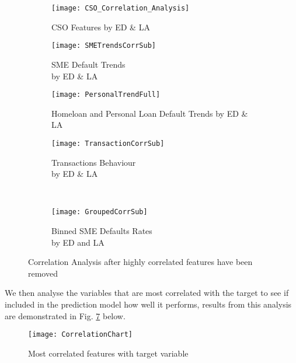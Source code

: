 \begin{figure}[H]
	\centering
	\begin{subfigure}[b]{0.32\textwidth}
		\captionsetup{font=scriptsize}
		\texttt{[image: CSO\_Correlation\_Analysis]}
		\caption{CSO Features by ED \& LA\\}
		\label{fig:CSOCorrelation}
	\end{subfigure}
	\begin{subfigure}[b]{0.32\textwidth}
		\captionsetup{font=scriptsize}
		\texttt{[image: SMETrendsCorrSub]}
		\caption{SME Default Trends \\by ED \& LA}\label{fig:SMETrendsCorrSub}
	\end{subfigure} 
	\begin{subfigure}[b]{0.32\textwidth}
		\captionsetup{font=scriptsize}
		\texttt{[image: PersonalTrendFull]}
		\caption{Homeloan and Personal Loan Default Trends by ED \& LA}
		\label{fig:PersonalTrendFull}
	\end{subfigure} 
	\medskip
	\begin{subfigure}[b]{0.32\textwidth}
		\captionsetup{font=scriptsize}
		\texttt{[image: TransactionCorrSub]}
		\caption{Transactions Behaviour \\by ED \& LA }\label{fig:TransactionCorrSub}
	\end{subfigure} ~\quad
	\begin{subfigure}[b]{0.32\textwidth}
		\captionsetup{font=scriptsize}
		\texttt{[image: GroupedCorrSub]}
		\caption{Binned SME Defaults Rates \\by ED and LA\\}
		\label{fig:GroupedCorrSub}
	\end{subfigure}
	\caption{Correlation Analysis after highly correlated features have been removed}
	\label{fig:unbal_corr_analysis_filtered}
\end{figure}

We then analyse the variables that are most correlated with the target to see if included in the prediction model how well it performs, results from this analysis are demonstrated in Fig. \ref{fig:Correlation Analysis} below.

\begin{figure}[H]
	\texttt{[image: CorrelationChart]}
	\caption{Most correlated features with target variable}
	\label{fig:Correlation Analysis}
\end{figure}

